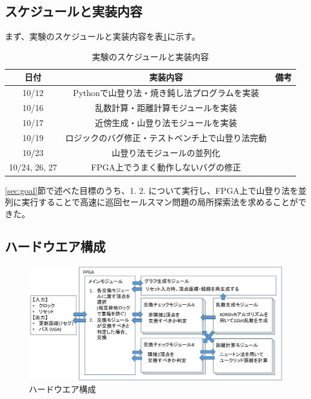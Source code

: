 \subsection{スケジュールと実装内容}
まず、実験のスケジュールと実装内容を表\ref{tab:schedule}に示す。
\begin{table}[h]
    \begin{center}
        \caption{実験のスケジュールと実装内容}\label{tab:schedule}
        \begin{tabular}{|c|c|c|} \hline
            日付 & 実装内容 & 備考 \\ \hline
            10/12 & Pythonで山登り法・焼き鈍し法プログラムを実装 &  \\ \hline
            10/16 & 乱数計算・距離計算モジュールを実装 &  \\ \hline
            10/17 & 近傍生成・山登り法モジュールを実装 &  \\ \hline
            10/19 & ロジックのバグ修正・テストベンチ上で山登り法完動 &  \\ \hline
            10/23 & 山登り法モジュールの並列化 &  \\ \hline
            10/24, 26, 27 & FPGA上でうまく動作しないバグの修正 &  \\ \hline
        \end{tabular}
    \end{center}
\end{table}
\ref{sec:goal}節で述べた目標のうち、1. 2. について実行し、FPGA上で山登り法を並列に実行することで高速に巡回セールスマン問題の局所探索法を求めることができた。

\subsection{ハードウエア構成}
\begin{figure}[h]
    \caption{ハードウエア構成}\label{fig:hardware}
    \begin{center}
        \includegraphics[width=15cm]{figure/hardware.png}
    \end{center}
\end{figure}

